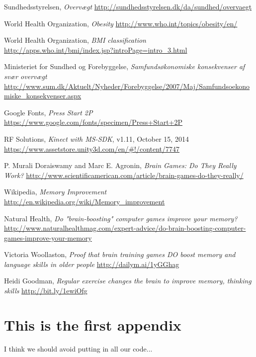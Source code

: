 \documentclass[11pt]{report}
\begin{document}
\begin{thebibliography}{9}
  Sundhedsstyrelsen,
  \emph{Overv\ae gt}
  \url{http://sundhedsstyrelsen.dk/da/sundhed/overvaegt}

	World Health Organization,
	\emph{Obesity}
	\url{http://www.who.int/topics/obesity/en/}
	
	World Health Organization,
	\emph{BMI classification}
	\url{http://apps.who.int/bmi/index.jsp?introPage=intro_3.html}

	Ministeriet for Sundhed og Forebyggelse,
	\emph{Samfunds\o konomiske konsekvenser af sv\ae r overv\ae gt}
	\url{http://www.sum.dk/Aktuelt/Nyheder/Forebyggelse/2007/Maj/Samfundsoekonomiske_konsekvenser.aspx}

	Google Fonts, \emph{Press Start 2P}
	\url{https://www.google.com/fonts/specimen/Press+Start+2P}
	
	RF Solutions, \emph{Kinect with MS-SDK}, v1.11, October 15, 2014
	\url{https://www.assetstore.unity3d.com/en/#!/content/7747}

	P. Murali Doraiswamy and Marc E. Agronin, \emph{Brain Games: Do They Really Work?}
	\url{http://www.scientificamerican.com/article/brain-games-do-they-really/}
	
	Wikipedia, \emph{Memory Improvement}
	\url{http://en.wikipedia.org/wiki/Memory_improvement}
	
	Natural Health, \emph{Do "brain-boosting" computer games improve your memory?}
	\url{http://www.naturalhealthmag.com/expert-advice/do-brain-boosting-computer-games-improve-your-memory}
	
	Victoria Woollaston, \emph{Proof that brain training games DO boost memory and language skills in older people}
	\url{http://dailym.ai/1yGGhag}
	
	Heidi Goodman, \emph{Regular exercise changes the brain to improve memory, thinking skills}
	\url{http://bit.ly/1ewiOfg}

\end{thebibliography}


\appendix

\chapter{This is the first appendix}
I think we should avoid putting in all our code...
\end{document}
